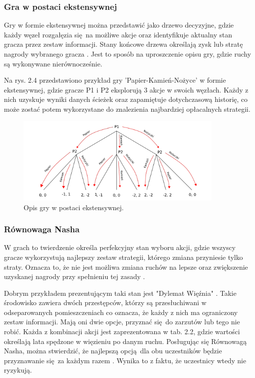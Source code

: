 \documentclass[12pt,oneside,a4paper]{report}
\begin{document}
\subsubsection{Gra w postaci ekstensywnej}

Gry w
formie ekstensywnej można przedstawić jako drzewo decyzyjne, gdzie każdy węzeł rozgałęzia się na
możliwe akcje oraz identyfikuje aktualny stan gracza przez zestaw informacji.
Stany końcowe drzewa określają zysk lub stratę nagrody wybranego gracza \cite{DCFR}.
Jest to sposób
na uproszczenie opisu gry, gdzie ruchy są wykonywane nierównocześnie.

Na rys. 2.4 przedstawiono przykład gry 'Papier-Kamień-Nożyce' w formie ekstensywnej, gdzie gracze P1 i
P2 eksplorują 3 akcje w swoich węzłach. 
Każdy z nich uzyskuje wyniki danych ścieżek oraz zapamiętuje dotychczasową historię, co może zostać potem
wykorzystane do znalezienia najbardziej opłacalnych strategii.

\begin{figure}[th!]
            \center
           \includegraphics[width=0.9\textwidth]{./img/drawing1.pdf}
           \caption{Opis gry w postaci ekstensywnej.}
\end{figure}

\vspace{5cm}
\subsubsection{Równowaga Nasha}

W grach to twierdzenie określa perfekcyjny stan wyboru akcji, gdzie wszyscy gracze wykorzystują najlepszy
zestaw strategii, którego zmiana przyniesie tylko straty. Oznacza to, że nie jest możliwa
zmiana ruchów na lepsze oraz zwiększenie uzyskanej nagrody przy spełnieniu tej zasady \cite{rn}. 

Dobrym przykładem prezentującym taki stan jest "Dylemat Więźnia" \cite{rn}. Takie środowisko zawiera 
dwóch przestępców, którzy są przesłuchiwani w odseparowanych pomieszczeniach co oznacza, że każdy z
nich ma ograniczony zestaw informacji. Mają oni dwie
opcje, przyznać się do zarzutów lub tego nie robić. Każda z kombinacji akcji jest
zaprezentowana w tab. 2.2, gdzie wartości określają lata spędzone w więzieniu po danym ruchu.
Posługując się Równowagą Nasha, można stwierdzić, że najlepszą opcją dla
obu uczestników będzie przyznawanie się za każdym razem \cite{rn}. Wynika to z faktu, że 
uczestnicy wtedy nie ryzykują.  
\end{document}
